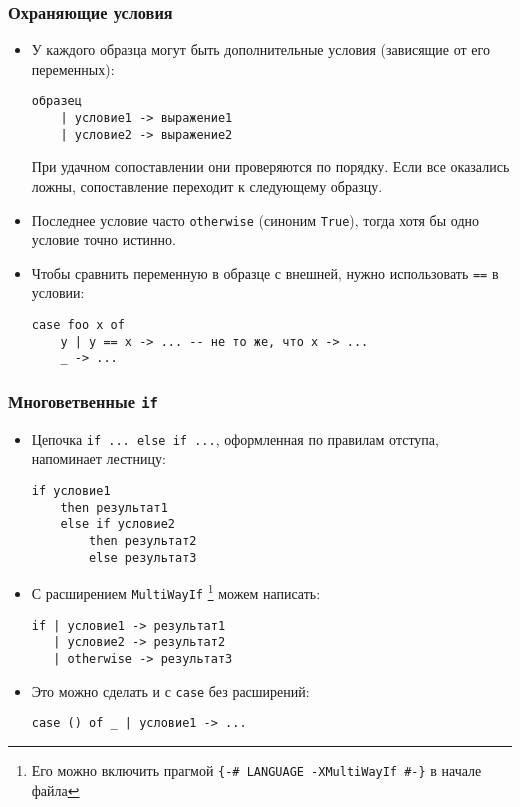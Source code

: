 \documentclass[10pt]{beamer}
\begin{document}
\begin{frame}[fragile]
  \frametitle{Охраняющие условия}
  \begin{itemize}
    \item У каждого образца могут быть дополнительные условия (зависящие от его переменных):
          \begin{lstlisting}[basicstyle=\ttfamily]
образец
    | условие1 -> выражение1 
    | условие2 -> выражение2
\end{lstlisting}
          При удачном сопоставлении они проверяются по порядку. Если все оказались ложны, сопоставление переходит к следующему образцу.
    \item Последнее условие часто \lstinline|otherwise| (синоним \lstinline|True|), тогда хотя бы одно условие точно истинно.
    \item Чтобы сравнить переменную в образце с внешней, нужно использовать \lstinline|==| в условии:
          \begin{lstlisting}[basicstyle=\ttfamily]
case foo x of
    y | y == x -> ... -- не то же, что x -> ...
    _ -> ...
\end{lstlisting}
  \end{itemize}
\end{frame}

\begin{frame}[fragile]
  \frametitle{Многоветвенные \lstinline[basicstyle=\ttfamily]|if|}
  \begin{itemize}
    \item Цепочка \lstinline|if ... else if ...|, оформленная по правилам отступа, напоминает лестницу:
          \begin{lstlisting}[basicstyle=\ttfamily\small]
if условие1
    then результат1
    else if условие2
        then результат2
        else результат3
\end{lstlisting}
    \item С расширением \lstinline|MultiWayIf| \cprotect\footnote{Его можно включить прагмой \lstinline|{-# LANGUAGE -XMultiWayIf #-}| в начале файла} можем написать:
          \begin{lstlisting}[basicstyle=\ttfamily\small]
if | условие1 -> результат1
   | условие2 -> результат2
   | otherwise -> результат3
\end{lstlisting}
    \item Это можно сделать и с \lstinline|case| без расширений:  \pause \begin{lstlisting}[basicstyle=\ttfamily\small]
case () of _ | условие1 -> ...
\end{lstlisting}
  \end{itemize}
\end{frame}
\end{document}
